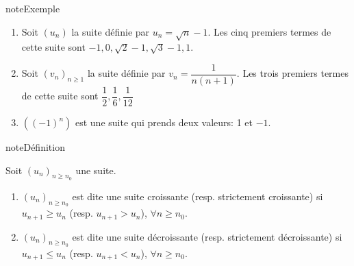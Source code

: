 \documentclass[letterpaper,10pt,french]{jupyterBook}
\begin{document}
\begin{sphinxadmonition}{note}{Exemple}
\begin{enumerate}
%
\item {} 
\sphinxAtStartPar
Soit \((u_n)\) la suite définie par \(u_n=\sqrt{n}-1.\) Les cinq premiers termes de cette suite sont \(-1,0,\sqrt{2}-1,\sqrt{3}-1,1.\)

\item {} 
\sphinxAtStartPar
Soit \((v_n)_{n\geq1}\) la suite définie par \(v_n=\dfrac{1}{n(n+1)}.\) Les trois premiers termes de cette suite sont \(\dfrac{1}{2},\dfrac{1}{6},\dfrac{1}{12}\)

\item {} 
\sphinxAtStartPar
\(((-1)^n)\) est une suite qui prends deux valeurs: 1 et \(-1.\)

\end{enumerate}
\end{sphinxadmonition}

\begin{sphinxadmonition}{note}{Définition}

\sphinxAtStartPar
Soit \((u_n)_{n\geq n_0}\) une suite.
\begin{enumerate}
%
\item {} 
\sphinxAtStartPar
\((u_n)_{n\geq n_0}\) est dite une suite croissante (resp. strictement croissante) si \(u_{n+1}\geq u_n\) (resp. \(u_{n+1}>u_n\)), \(\forall n\geq n_0.\)

\item {} 
\sphinxAtStartPar
\((u_n)_{n\geq n_0}\) est dite une suite décroissante (resp. strictement décroissante) si \(u_{n+1}\leq u_n\) (resp. \(u_{n+1}<u_n\)), \(\forall n\geq n_0.\)

\end{enumerate}
\end{sphinxadmonition}
\end{document}
